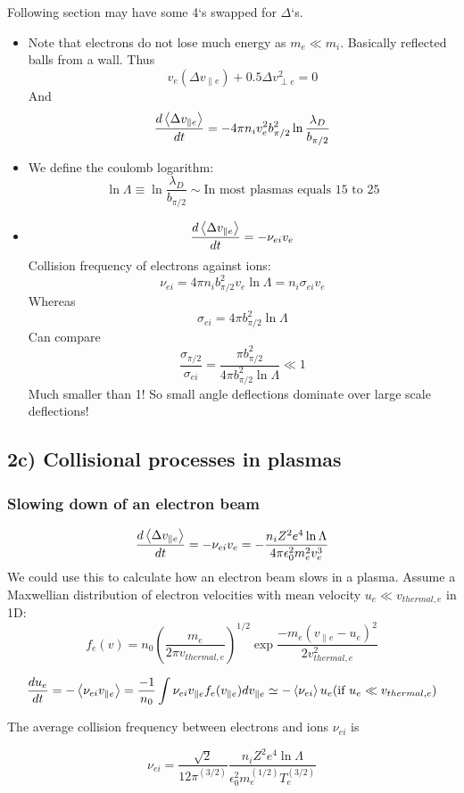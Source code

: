 Following section may have some 4`s swapped for $\Delta$`s. 
\begin{itemize}
\item Note that electrons do not lose much energy as $m_e \ll m_i$. Basically reflected balls from a wall. Thus
\[ v_e (\Delta v_{\parallel e}) + 0.5 \Delta v_{\perp e}^2 = 0\]
And
\[\frac{d \left< \Delta v_{\parallel e} \right>}{d t} = - 4 \pi n_i v_e^2 b_{\pi/2}^2 \ln{\frac{\lambda_D}{b_{\pi/2}}} \]
\item We define the coulomb logarithm: 
\[ \ln{\Lambda} \equiv \ln{\frac{\lambda_D}{b_{\pi/2}}} \sim \text{In most plasmas equals  15 to 25} \]
\item 
\[ \frac{d \left< \Delta v_{\parallel e}  \right>}{d t} = - \nu_{ei} v_e \]
Collision frequency of electrons against ions:
\[ \nu_{ei} = 4 \pi n_i b_{\pi/2}^2 v_e \ln{\Lambda} = n_i \sigma_{ei} v_e \]
Whereas
\[ \sigma_{ei} = 4 \pi b_{\pi/2}^2 \ln{\Lambda} \]
Can compare 
\[ \frac{\sigma_{\pi/2}}{\sigma_{ei}} = \frac{\pi b_{\pi/2}^2}{4 \pi b_{\pi/2}^2 \ln{\Lambda}} \ll 1\]
Much smaller than 1! So small angle deflections dominate over large scale deflections!
\end{itemize}

\subsection{2c) Collisional processes in plasmas}
\subsubsection{Slowing down of an electron beam}
\[ \frac{d \left< \Delta v_{\parallel e}  \right>}{d t} = - \nu_{ei} v_e = -\frac{n_i Z^2 e^4 \ln{\Lambda}}{4 \pi \epsilon_0^2 m_e^2 v_e^3} \]
We could use this to calculate how an electron beam slows in a plasma.
Assume a Maxwellian distribution of electron velocities with mean velocity $u_e\ll v_{thermal, e}$ in 1D:
\[ f_e(v) = n_0 (\frac{m_e}{2 \pi v_{thermal,e}})^{1/2} \exp{\frac{-m_e (v_{\parallel e} - u_e)^2}{2 v_{thermal,e}^2}} \]

\[ \frac{d u_e}{d t} = -\left< \nu_{ei} v_{\parallel e} \right> = \frac{-1}{n_0} \int{\nu_{ei} v_{\parallel e} f_e(v_{\parallel e}) dv_{\parallel e}} \simeq -\left< \nu_{ei} \right> u_e (\text{if } u_e \ll v_{thermal, e})\]  

The average collision frequency between electrons and ions $\nu_{ei}$ is

\[ \nu_{ei} = \frac{\sqrt{2}}{12 \pi^(3/2)} \frac{n_i Z^2 e^4 \ln{\Lambda}}{\epsilon_0^2 m_e^(1/2) T_e^(3/2)} \]

